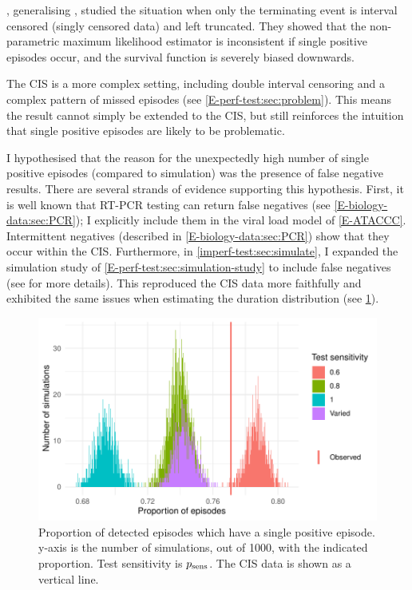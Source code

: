 \documentclass[thesis.tex]{subfiles}
\begin{document}
\Textcite{shenNonparametrica}, generalising \textcite{panNote}, studied the situation when only the terminating event is interval censored (\ie singly censored data) and left truncated.
They showed that the non-parametric maximum likelihood estimator is inconsistent if single positive episodes occur, and the survival function is severely biased downwards.

The CIS is a more complex setting, including double interval censoring and a complex pattern of missed episodes (see \cref{E-perf-test:sec:problem}).
This means the result cannot simply be extended to the CIS, but still reinforces the intuition that single positive episodes are likely to be problematic.

I hypothesised that the reason for the unexpectedly high number of single positive episodes (compared to simulation) was the presence of false negative results.
There are several strands of evidence supporting this hypothesis.
First, it is well known that RT-PCR testing can return false negatives  (see \cref{E-biology-data:sec:PCR}); I explicitly include them in the viral load model of \cref{E-ATACCC}.
Intermittent negatives (described in  \cref{E-biology-data:sec:PCR}) show that they occur within the CIS.
Furthermore, in \cref{imperf-test:sec:simulate}, I expanded the simulation study of \cref{E-perf-test:sec:simulation-study} to include false negatives (see  for more details).
This reproduced the CIS data more faithfully and exhibited the same issues when estimating the duration distribution (see \cref{imperf-test:fig:sim-single-pos}).
\begin{figure}
  \centering \includegraphics{cis-imperfect-testing/sim-single-positive-episodes}
  \caption[Single positive episodes in CIS simulation]{%
    Proportion of detected episodes which have a single positive episode.
    y-axis is the number of simulations, out of 1000, with the indicated proportion.
    Test sensitivity is $p_\text{sens}$.
    The CIS data is shown as a vertical line.
  }
  \label{imperf-test:fig:sim-single-pos}
\end{figure}
\end{document}
